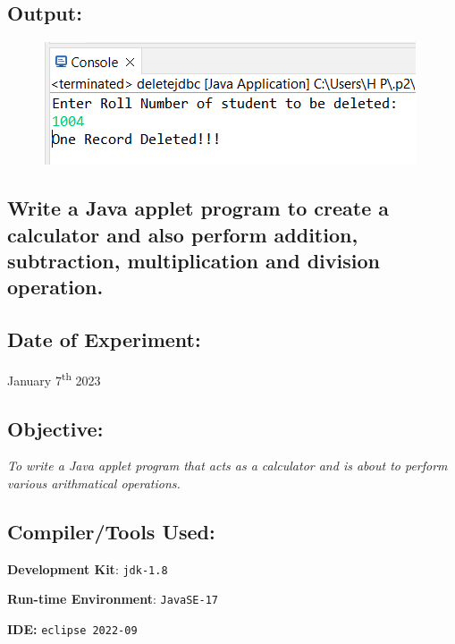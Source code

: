 \documentclass[12pt, a4paper]{article}
\begin{document}
\subsection*{Output:}
\begin{figure}[h]
  \centering
  \includegraphics[width=\textwidth]{djdbc}
\end{figure}
\newpage

\begin{tcolorbox}
  \section{Write a Java applet program to create a calculator and also perform addition, subtraction, multiplication and division operation.}
\end{tcolorbox}

\subsection*{Date of Experiment:}
January 7\textsuperscript{th} 2023

\subsection*{Objective:}
\emph{\large{To write a Java applet program that acts as a calculator and is about to perform various arithmatical operations.}}

\subsection*{Compiler/Tools Used:}
\textbf{Development Kit}: \verb+jdk-1.8+

\textbf{Run-time Environment}: \verb+JavaSE-17+

\textbf{IDE:} \verb+eclipse 2022-09+
\end{document}
